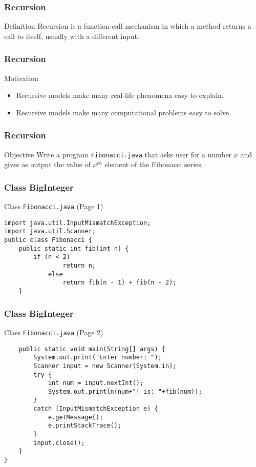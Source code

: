 \documentclass[10pt, compress]{beamer}
\begin{document}
\begin{frame}[fragile]
\frametitle{Recursion}
	\begin{block}{Definition}
		Recursion is a function-call mechanism in which a method returns a call to itself, usually with a different input.
	\end{block}
\end{frame}

\begin{frame}[fragile]
\frametitle{Recursion}
	\begin{block}{Motivation}
		\begin{itemize}
			\item[] Recursive models make many real-life phenomena easy to explain.
			\item[] Recursive models make many computational problems easy to solve.
		\end{itemize}
	\end{block}
\end{frame}

\begin{frame}[fragile]
\frametitle{Recursion}
	\begin{block}{Objective}
		Write a program \texttt{Fibonacci.java} that asks user for a number $x$ and gives as output the value of $x^{th}$ element of the Fibonacci series.
	\end{block}
\end{frame}

\begin{frame}[fragile]
\frametitle{Class BigInteger}
	\begin{block}{Class \texttt{Fibonacci.java} (Page 1)}
		\begin{verbatim}
import java.util.InputMismatchException;
import java.util.Scanner;
public class Fibonacci {
	public static int fib(int n) {
		if (n < 2)
				return n;
			else
				return fib(n - 1) + fib(n - 2);
	}
		\end{verbatim}
	\end{block}
\end{frame}

\begin{frame}[fragile]
\frametitle{Class BigInteger}
	\begin{block}{Class \texttt{Fibonacci.java} (Page 2)}
		\begin{verbatim}
	public static void main(String[] args) {
		System.out.print("Enter number: ");
		Scanner input = new Scanner(System.in);
		try {
			int num = input.nextInt();
			System.out.println(num+"! is: "+fib(num));
		}
		catch (InputMismatchException e) {
			e.getMessage();
			e.printStackTrace();
		}
		input.close();
	}
}
		\end{verbatim}
	\end{block}
\end{frame}
\end{document}
